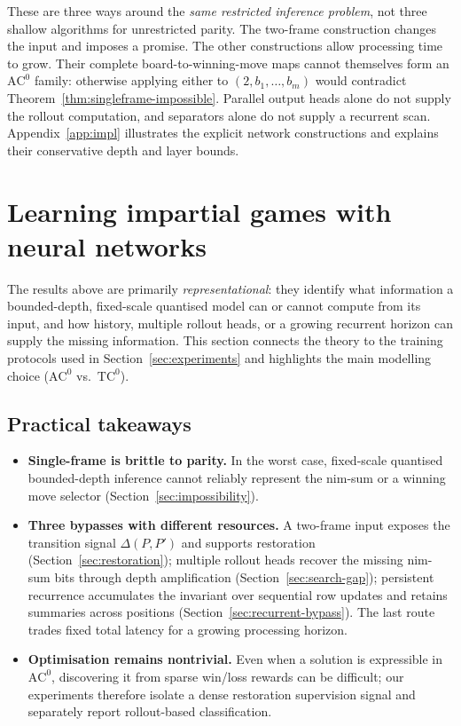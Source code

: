 \documentclass[11pt]{article}
\newcommand{\AC}{\mathrm{AC}}
\newcommand{\TC}{\mathrm{TC}}
\theoremstyle{plain}
\theoremstyle{definition}
\theoremstyle{remark}
\numberwithin{equation}{section}
\begin{document}
These are three ways around the \emph{same restricted inference problem}, not three shallow algorithms for unrestricted parity. The two-frame construction changes the input and imposes a promise. The other constructions allow processing time to grow. Their complete board-to-winning-move maps cannot themselves form an $\AC^0$ family: otherwise applying either to $(2,b_1,\ldots,b_m)$ would contradict Theorem~\ref{thm:singleframe-impossible}. Parallel output heads alone do not supply the rollout computation, and separators alone do not supply a recurrent scan. Appendix~\ref{app:impl} illustrates the explicit network constructions and explains their conservative depth and layer bounds.

\section{Learning impartial games with neural networks}
\label{sec:learnability}

The results above are primarily \emph{representational}: they identify what information a bounded-depth, fixed-scale quantised model can or cannot compute from its input, and how history, multiple rollout heads, or a growing recurrent horizon can supply the missing information.
This section connects the theory to the training protocols used in Section~\ref{sec:experiments} and highlights the main modelling choice ($\AC^0$ vs.\ $\TC^0$).

\subsection{Practical takeaways}
\begin{itemize}[leftmargin=*]
\item \textbf{Single-frame is brittle to parity.}
In the worst case, fixed-scale quantised bounded-depth inference cannot reliably represent the nim-sum or a winning move selector (Section~\ref{sec:impossibility}).

\item \textbf{Three bypasses with different resources.}
A two-frame input exposes the transition signal $\Delta(P,P')$ and supports restoration (Section~\ref{sec:restoration}); multiple rollout heads recover the missing nim-sum bits through depth amplification (Section~\ref{sec:search-gap}); persistent recurrence accumulates the invariant over sequential row updates and retains summaries across positions (Section~\ref{sec:recurrent-bypass}). The last route trades fixed total latency for a growing processing horizon.

\item \textbf{Optimisation remains nontrivial.}
Even when a solution is expressible in $\AC^0$, discovering it from sparse win/loss rewards can be difficult; our experiments therefore isolate a dense restoration supervision signal and separately report rollout-based classification.
\end{itemize}
\end{document}
